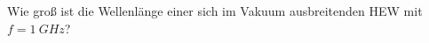 \begin{question}[section=3,name={Wellenlänge},difficulty=,quantity=,type=thr,tags={20130724}]
	Wie groß ist die Wellenlänge einer sich im Vakuum ausbreitenden HEW mit $f = 1~GHz$?
	
	
\end{question}
\begin{solution}
	
\end{solution}